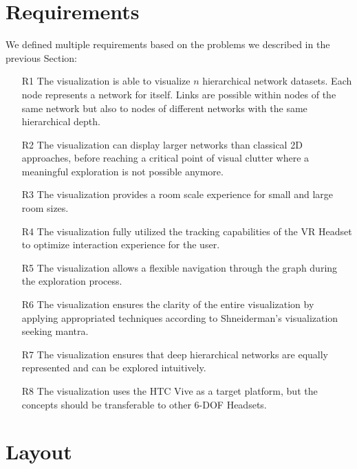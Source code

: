 \section{Requirements}
\label{chap:ps-requirements}
We defined multiple requirements based on the problems we described in the previous Section:\\
\begin{enumerate}
    \item[R1]\label{req:R1} The visualization is able to visualize $n$ hierarchical network datasets. Each node represents a network for itself. Links are possible within nodes of the same network but also to nodes of different networks with the same hierarchical depth.
    \item[R2]\label{req:R2} The visualization can display larger networks than classical 2D approaches, before reaching a critical point of visual clutter where a meaningful exploration is not possible anymore.
    \item[R3]\label{req:R3} The visualization provides a room scale experience for small and large room sizes.
    \item[R4]\label{req:R4} The visualization fully utilized the tracking capabilities of the VR Headset to optimize interaction experience for the user.
    \item[R5]\label{req:R5} The visualization allows a flexible navigation through the graph during the exploration process.
    \item[R6]\label{req:R6} The visualization ensures the clarity of the entire visualization by applying appropriated techniques according to Shneiderman's visualization seeking mantra.
    \item[R7]\label{req:R7} The visualization ensures that deep hierarchical networks are equally represented and can be explored intuitively.
    \item[R8]\label{req:R8} The visualization uses the HTC Vive as a target platform, but the concepts should be transferable to other 6-DOF Headsets. 
\end{enumerate}

\section{Layout}
\label{chap:ps-layout}

